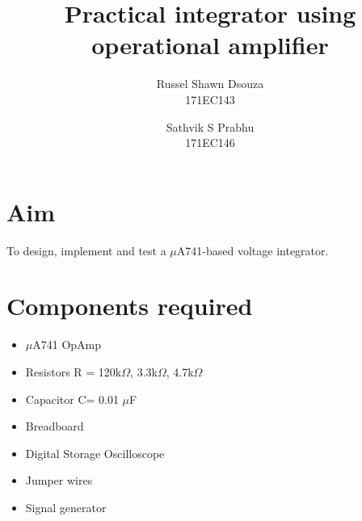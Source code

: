 \documentclass[12pt, titlepage]{article}
\title{\textbf{Practical integrator using operational amplifier}}
\author{
  Russel Shawn Dsouza\\
  171EC143
  \and
  Sathvik S Prabhu\\
  171EC146
}
\date{}
\theoremstyle{definition}
\begin{document}
  \maketitle

  \tableofcontents

  \newpage
  \section{Aim}
  To design, implement and test a $\mu$A741-based voltage integrator.


  \section*{Components required}
    \begin{itemize}
      \item $\mu$A741 OpAmp
      \item Resistors R = 120k$\Omega$, 3.3k$\Omega$, 4.7k$\Omega$
      \item Capacitor C= 0.01 $\mu$F
      \item Breadboard
      \item Digital Storage Oscilloscope
      \item Jumper wires
      \item Signal generator
    \end{itemize}
\end{document}

